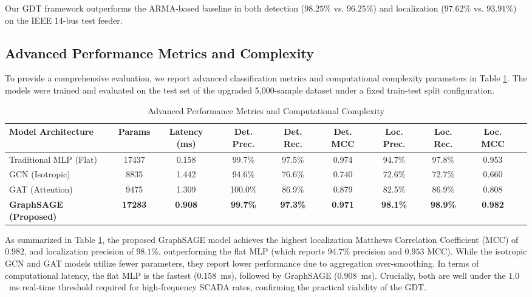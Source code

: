 \documentclass[conference]{IEEEtran}
\begin{document}
Our GDT framework outperforms the ARMA-based baseline in both detection ($98.25\%$ vs. $96.25\%$) and localization ($97.62\%$ vs. $93.91\%$) on the IEEE 14-bus test feeder.

\subsection{Advanced Performance Metrics and Complexity}
To provide a comprehensive evaluation, we report advanced classification metrics and computational complexity parameters in Table \ref{tab:advanced_metrics}. The models were trained and evaluated on the test set of the upgraded 5,000-sample dataset under a fixed train-test split configuration.

\begin{table}[t]
  \caption{Advanced Performance Metrics and Computational Complexity}
  \label{tab:advanced_metrics}
  \centering
  \begin{tabular}{lccccccccc}
    \hline
    \textbf{Model Architecture} & \textbf{Params} & \textbf{Latency (ms)} & \textbf{Det. Prec.} & \textbf{Det. Rec.} & \textbf{Det. MCC} & \textbf{Loc. Prec.} & \textbf{Loc. Rec.} & \textbf{Loc. MCC} \\
    \hline
    Traditional MLP (Flat) & 17437 & 0.158 & 99.7\% & 97.5\% & 0.974 & 94.7\% & 97.8\% & 0.953 \\
    GCN (Isotropic) & 8835 & 1.442 & 94.6\% & 76.6\% & 0.740 & 72.6\% & 72.7\% & 0.660 \\
    GAT (Attention) & 9475 & 1.309 & 100.0\% & 86.9\% & 0.879 & 82.5\% & 86.9\% & 0.808 \\
    \textbf{GraphSAGE (Proposed)} & \textbf{17283} & \textbf{0.908} & \textbf{99.7\%} & \textbf{97.3\%} & \textbf{0.971} & \textbf{98.1\%} & \textbf{98.9\%} & \textbf{0.982} \\
    \hline
  \end{tabular}
\end{table}

As summarized in Table \ref{tab:advanced_metrics}, the proposed GraphSAGE model achieves the highest localization Matthews Correlation Coefficient (MCC) of $0.982$, and localization precision of $98.1\%$, outperforming the flat MLP (which reports $94.7\%$ precision and $0.953$ MCC). While the isotropic GCN and GAT models utilize fewer parameters, they report lower performance due to aggregation over-smoothing. In terms of computational latency, the flat MLP is the fastest ($0.158$~ms), followed by GraphSAGE ($0.908$~ms). Crucially, both are well under the $1.0$~ms real-time threshold required for high-frequency SCADA rates, confirming the practical viability of the GDT.
\end{document}
